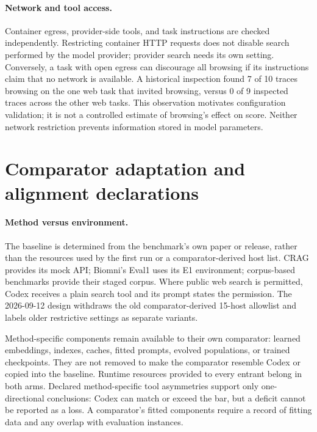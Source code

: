 \paragraph{Network and tool access.}
Container egress, provider-side tools, and task instructions are checked independently.
Restricting container HTTP requests does not disable search performed by the model provider;
provider search needs its own setting. Conversely, a task with open egress can discourage all
browsing if its instructions claim that no network is available. A historical inspection found
7 of 10 traces browsing on the one web task that invited browsing, versus 0 of 9 inspected
traces across the other web tasks. This observation motivates configuration validation; it is
not a controlled estimate of browsing's effect on score. Neither network restriction prevents
information stored in model parameters.

\section{Comparator adaptation and alignment declarations}
\label{app:alignment}

\paragraph{Method versus environment.}
The baseline is determined from the benchmark's own paper or release, rather than the resources
used by the first run or a comparator-derived host list. CRAG provides its mock API; Biomni's
Eval1 uses its E1 environment; corpus-based benchmarks provide their staged corpus. Where
public web search is permitted, Codex receives a plain search tool and its prompt states the
permission. The 2026-09-12 design withdraws the old comparator-derived 15-host allowlist and
labels older restrictive settings as separate variants.

Method-specific components remain available to their own comparator: learned embeddings,
indexes, caches, fitted prompts, evolved populations, or trained checkpoints. They are not
removed to make the comparator resemble Codex or copied into the baseline. Runtime resources
provided to every entrant belong in both arms. Declared method-specific tool asymmetries support
only one-directional conclusions: Codex can match or exceed the bar, but a deficit cannot be
reported as a loss. A comparator's fitted components require a record of fitting data and any
overlap with evaluation instances.


